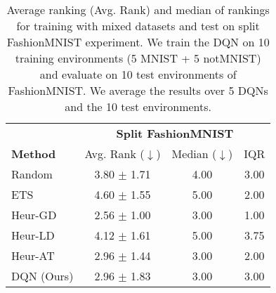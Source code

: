 
\begin{table}[t]
\centering
\caption{Average ranking (Avg. Rank) and median of rankings for training with mixed datasets and test on split FashionMNIST experiment. We train the DQN on 10 training environments (5 MNIST + 5 notMNIST) and evaluate on 10 test environments of FashionMNIST. We average the results over 5 DQNs and the 10 test environments.
}
\label{tab:average_ranking_fashionmnist_mixed_datasets}
\begin{tabular}{l c c c}
\toprule
 & \multicolumn{3}{c}{ {\bf Split FashionMNIST}} \\
 \cmidrule(lr){2-4}
 {\bf Method} & Avg. Rank ($\downarrow$) & Median ($\downarrow$) & IQR \\ 
 \midrule
 Random         & 3.80 $\pm$ 1.71 & 4.00 & 3.00 \\
 ETS            & 4.60 $\pm$ 1.55 & 5.00 & 2.00 \\
 Heur-GD        & 2.56 $\pm$ 1.00 & 3.00 & 1.00 \\
 Heur-LD        & 4.12 $\pm$ 1.61 & 5.00 & 3.75 \\
 Heur-AT        & 2.96 $\pm$ 1.44 & 3.00 & 2.00 \\
 \midrule
 DQN (Ours)     & 2.96 $\pm$ 1.83 & 3.00 & 3.00 \\
\bottomrule
\end{tabular}
\end{table}


\begin{comment}
\begin{table}[t]
\centering
\caption{Average ranking (Avg. Rank) and median of rankings for training with mixed datasets and test on split FashionMNIST experiment. We train the DQN on 20 training envs (10 MNIST + 10 notMNIST) and evaluate on 10 test envs of FashionMNIST. We average the results over 5 DQNs and the 10 test envs.
}
\label{tab:train_mixed_dataset_test_fashionmnist}
\begin{tabular}{l c c c}
\toprule
 & \multicolumn{3}{c}{ {\bf Split FashionMNIST}} \\
 \cmidrule(lr){2-4}
 {\bf Method} & Avg. Rank ($\downarrow$) & Median ($\downarrow$) & IQR \\ 
 \midrule
 Random         & 3.30 $\pm$ 1.28 & 4.00 & 2.00 \\
 ETS            & 3.88 $\pm$ 1.21 & 4.00 & 2.00 \\
 Heuristic1     & 2.08 $\pm$ 0.80 & 2.00 & 1.00 \\
 Heuristic2     & 2.96 $\pm$ 1.50 & 3.00 & 2.00 \\
 \midrule
 DQN (Ours)     & 2.78 $\pm$ 1.50 & 3.00 & 3.00 \\
\bottomrule
\end{tabular}
\vskip -0.1in
\end{table}
\vspace{-3mm}
\end{comment}